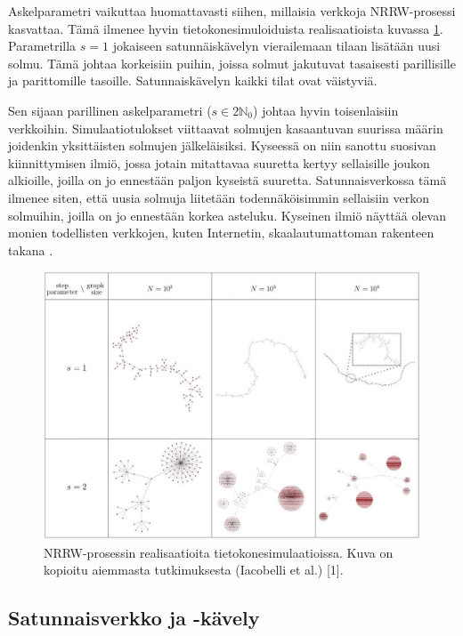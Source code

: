 \documentclass[finnish, 12pt, a4paper, sci, utf8, pdfa]{aaltothesis}
\newcommand{\N}{\mathbb{N}}
\begin{document}
Askelparametri vaikuttaa huomattavasti siihen, millaisia verkkoja NRRW-prosessi kasvattaa. Tämä ilmenee hyvin tietokonesimuloiduista realisaatioista kuvassa \ref{simulaatiot}. Parametrilla \( s = 1 \) jokaiseen satunnäiskävelyn vierailemaan tilaan lisätään uusi solmu. Tämä johtaa korkeisiin puihin, joissa solmut jakutuvat tasaisesti parillisille ja parittomille tasoille. Satunnaiskävelyn kaikki tilat ovat väistyviä.

Sen sijaan parillinen askelparametri (\( s \in 2\N_{0} \)) johtaa hyvin toisenlaisiin verkkoihin. Simulaatiotulokset viittaavat solmujen kasaantuvan suurissa määrin joidenkin yksittäisten solmujen jälkeläisiksi. Kyseessä on niin sanottu suosivan kiinnittymisen ilmiö, jossa jotain mitattavaa suuretta kertyy sellaisille joukon alkioille, joilla on jo ennestään paljon kyseistä suuretta. Satunnaisverkossa tämä ilmenee siten, että uusia solmuja liitetään todennäköisimmin sellaisiin verkon solmuihin, joilla on jo ennestään korkea asteluku. Kyseinen ilmiö näyttää olevan monien todellisten verkkojen, kuten Internetin, skaalautumattoman rakenteen takana \cite{Babarasi}.

\begin{figure}[htb]
\centering
\includegraphics[width=.9\textwidth]{pictures/simulations.jpg}
   \caption{NRRW-prosessin realisaatioita tietokonesimulaatioissa. Kuva on kopioitu aiemmasta tutkimuksesta (Iacobelli et al.) [1]. \label{simulaatiot}}
\end{figure}

\subsection{Satunnaisverkko ja -kävely}
\end{document}
